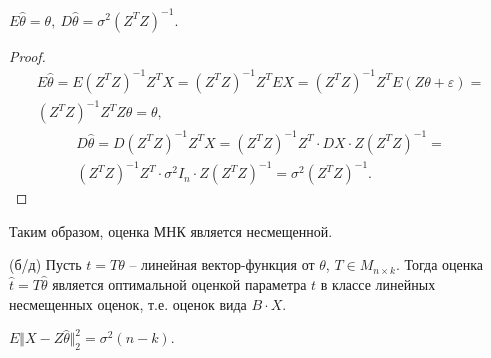 \begin{proposition}
    $\displaystyle E\hat{\theta } =\theta ,\ D\hat{\theta } =\sigma ^{2}\left( Z^{T} Z\right)^{-1}$.
\end{proposition}
\begin{proof}
    \begin{gather*}
        E\hat{\theta } =E\left( Z^{T} Z\right)^{-1} Z^{T} X=\left( Z^{T} Z\right)^{-1} Z^{T} EX=\left( Z^{T} Z\right)^{-1} Z^{T} E( Z\theta +\varepsilon ) =\\
        \left( Z^{T} Z\right)^{-1} Z^{T} Z\theta =\theta ,
    \end{gather*}
    \begin{gather*}
        D\hat{\theta } =D\left( Z^{T} Z\right)^{-1} Z^{T} X=\left( Z^{T} Z\right)^{-1} Z^{T} \cdotp DX\cdotp Z\left( Z^{T} Z\right)^{-1} =\\
        \left( Z^{T} Z\right)^{-1} Z^{T} \cdotp \sigma ^{2} I_{n} \cdotp Z\left( Z^{T} Z\right)^{-1} =\sigma ^{2}\left( Z^{T} Z\right)^{-1} .
    \end{gather*}
\end{proof}
\begin{note}
    Таким образом, оценка МНК является несмещенной.
\end{note}
\begin{theorem}
    (б/д) Пусть $\displaystyle t=T\theta $ -- линейная вектор-функция от $\displaystyle \theta $, $\displaystyle T\in M_{n\times k}$. Тогда оценка $\displaystyle \hat{t} =T\hat{\theta }$ является оптимальной оценкой параметра $\displaystyle t$ в классе линейных несмещенных оценок, т.е. оценок вида $\displaystyle B\cdotp X$.
\end{theorem}
\begin{lemma}
    $\displaystyle E\Vert X-Z\hat{\theta }\Vert _{2}^{2} =\sigma ^{2}( n-k)$.
\end{lemma}
